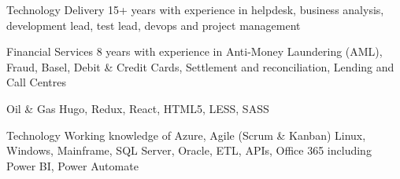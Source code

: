 

\begin{cvskills}

  \cvskill
    {Technology Delivery} %
    {15+ years with experience in helpdesk, business analysis, development lead, test lead, devops and project management} %

  \cvskill
    {Financial Services} %
    {8 years with experience in Anti-Money Laundering (AML), Fraud, Basel, Debit \& Credit Cards, Settlement and reconciliation, Lending and Call Centres} %

  \cvskill
    {Oil \& Gas} %
    {Hugo, Redux, React, HTML5, LESS, SASS} %

  \cvskill
    {Technology} %
    {Working knowledge of Azure, Agile (Scrum \& Kanban) Linux, Windows, Mainframe, SQL Server, Oracle, ETL, APIs, Office 365 including Power BI, Power Automate} %

\end{cvskills}
